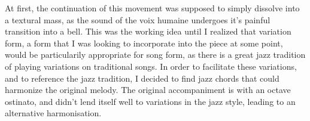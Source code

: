 \documentclass[12pt,twoside,maitrise]{dms}
\theoremstyle{definition}
\begin{document}
At first, the continuation of this movement was supposed to simply dissolve into a textural mass, as the sound of the voix humaine undergoes it's painful transition into a bell.
This was the working idea until I realized that variation form, a form that I was looking to incorporate into the piece at some point, would be particularily appropriate for song form, as there is a great jazz tradition of playing variations on traditional songs.
In order to facilitate these variations, and to reference the jazz tradition, I decided to find jazz chords that could harmonize the original melody.
The original accompaniment is with an octave ostinato, and didn't lend itself well to variations in the jazz style, leading to an alternative harmonisation.

\end{document}
